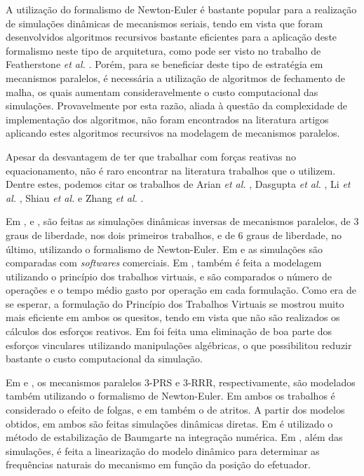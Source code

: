 \documentclass[]{politex}
\begin{document}
A utilização do formalismo de Newton-Euler é bastante popular para a realização de simulações dinâmicas de mecanismos seriais, tendo em vista que foram desenvolvidos algoritmos recursivos bastante eficientes para a aplicação deste formalismo neste tipo de arquitetura, como pode ser visto no trabalho de Featherstone \emph{et al.} \cite{Featherstone}. Porém, para se beneficiar deste tipo de estratégia em mecanismos paralelos, é necessária a utilização de algoritmos de fechamento de malha, os quais aumentam consideravelmente o custo computacional das simulações. Provavelmente por esta razão, aliada à questão da complexidade de implementação dos algoritmos, não foram encontrados na literatura artigos aplicando estes algoritmos recursivos na modelagem de mecanismos paralelos. 

Apesar da desvantagem de ter que trabalhar com forças reativas no equacionamento, não é raro encontrar na literatura trabalhos que o utilizem. Dentre estes, podemos citar os trabalhos de Arian \emph{et al.} \cite{Arian}, Dasgupta \emph{et al.} \cite{Dasgupta}, Li \emph{et al.} \cite{LiWang}, Shiau \emph{et al.} \cite{Shiau} e Zhang \emph{et al.} \cite{Zhang}.

Em \cite{Arian}, \cite{LiWang} e \cite{Dasgupta}, são feitas as simulações dinâmicas inversas de mecanismos paralelos, de 3 graus de liberdade, nos dois primeiros trabalhos, e de 6 graus de liberdade, no último, utilizando o formalismo de Newton-Euler. Em \cite{Arian} e \cite{LiWang} as simulações são comparadas com \emph{softwares} comerciais. Em \cite{Arian}, também é feita a modelagem utilizando o princípio dos trabalhos virtuais, e são comparados o número de operações e o tempo médio gasto por operação em cada formulação. Como era de se esperar, a formulação do Princípio dos Trabalhos Virtuais se mostrou muito mais eficiente em ambos os quesitos, tendo em vista que não são realizados os cálculos dos esforços reativos. Em \cite{Dasgupta} foi feita uma eliminação de boa parte dos esforços vinculares utilizando manipulações algébricas, o que possibilitou reduzir bastante o custo computacional da simulação.

Em \cite{Shiau} e \cite{Zhang}, os mecanismos paralelos 3-PRS e 3-RRR, respectivamente, são modelados  também utilizando o formalismo de Newton-Euler. Em ambos os trabalhos é considerado o efeito de folgas, e em \cite{Shiau} também o de atritos. A partir dos modelos obtidos, em ambos são feitas simulações dinâmicas diretas. Em \cite{Zhang} é utilizado o método de estabilização de Baumgarte \cite{Baumgarte} na integração numérica. Em \cite{Shiau}, além das simulações, é feita a linearização do modelo dinâmico para determinar as frequências naturais do mecanismo em função da posição do efetuador.
\end{document}
